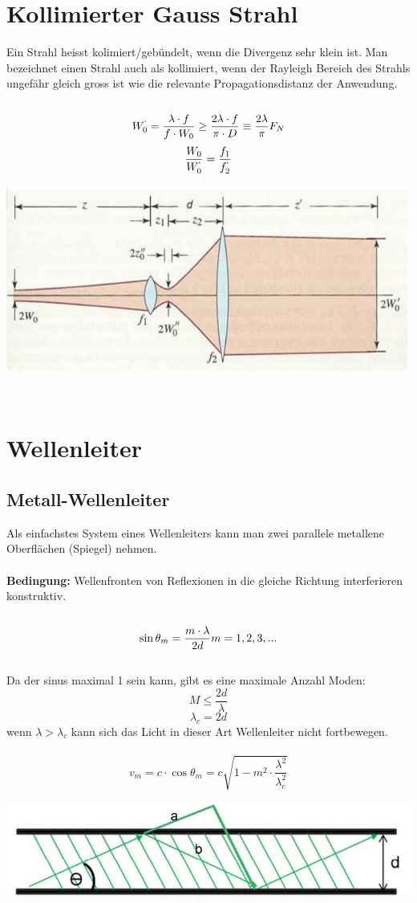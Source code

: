 \section{Kollimierter Gauss Strahl}
Ein Strahl heisst kolimiert/gebündelt, wenn die Divergenz sehr klein ist. Man bezeichnet einen Strahl auch als kollimiert, wenn der Rayleigh Bereich des Strahls ungefähr gleich gross ist wie die relevante Propagationsdistanz der Anwendung.\\
\\
\[
	W_0^`=\frac{\lambda\cdot f}{f\cdot W_0} \geq
	 \frac{2\lambda\cdot f}{\pi\cdot D} 
	 \equiv \frac{2\lambda}{\pi} F_{N}
\]
\[
	\frac{W_0}{W_0^`}=	\frac{f_1}{f_2^`}
\]
\begin{center}
	\includegraphics[scale = 0.25]{images/koll_gauss_strahl.jpg}
\end{center}
\
\\
\section{Wellenleiter}
\subsection{Metall-Wellenleiter}
Als einfachstes System eines Wellenleiters kann man zwei parallele metallene Oberflächen (Spiegel) nehmen.\\
\\
\textbf{Bedingung:} Wellenfronten von Reflexionen in die gleiche Richtung interferieren konstruktiv.\\
\\
\[
	\sin \theta_m= \frac{m \cdot \lambda}{2d}\\
	m=1,2,3,... \\ \\
\]
\\
Da der sinus maximal 1 sein kann, gibt es eine maximale Anzahl Moden:
\[
	M\leq\frac{2d}{\lambda}
\]
\[
	\lambda_c=2d
\]
wenn $\lambda> \lambda_c$ kann sich das Licht in dieser Art Wellenleiter nicht fortbewegen.\\
\
\[
	v_m=c\cdot \cos\theta_m=c\sqrt{1-m^2\cdot\frac{\lambda^2}{\lambda_c^2}}
\] 
\begin{center}
	\includegraphics[scale = 0.3]{images/wellenleiter.jpg}
\end{center}
\
\\
